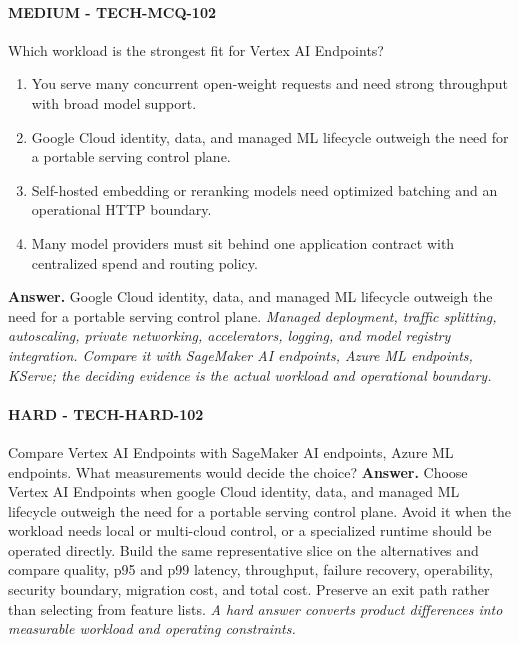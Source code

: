 \paragraph{MEDIUM - TECH-MCQ-102} Which workload is the strongest fit for Vertex AI Endpoints?
\begin{enumerate}[label=\Alph*.]
\item You serve many concurrent open-weight requests and need strong throughput with broad model support.
\item Google Cloud identity, data, and managed ML lifecycle outweigh the need for a portable serving control plane.
\item Self-hosted embedding or reranking models need optimized batching and an operational HTTP boundary.
\item Many model providers must sit behind one application contract with centralized spend and routing policy.
\end{enumerate}
\textbf{Answer.} Google Cloud identity, data, and managed ML lifecycle outweigh the need for a portable serving control plane.
\textit{Managed deployment, traffic splitting, autoscaling, private networking, accelerators, logging, and model registry integration. Compare it with SageMaker AI endpoints, Azure ML endpoints, KServe; the deciding evidence is the actual workload and operational boundary.}
\paragraph{HARD - TECH-HARD-102} Compare Vertex AI Endpoints with SageMaker AI endpoints, Azure ML endpoints. What measurements would decide the choice?
\textbf{Answer.} Choose Vertex AI Endpoints when google Cloud identity, data, and managed ML lifecycle outweigh the need for a portable serving control plane. Avoid it when the workload needs local or multi-cloud control, or a specialized runtime should be operated directly. Build the same representative slice on the alternatives and compare quality, p95 and p99 latency, throughput, failure recovery, operability, security boundary, migration cost, and total cost. Preserve an exit path rather than selecting from feature lists.
\textit{A hard answer converts product differences into measurable workload and operating constraints.}
